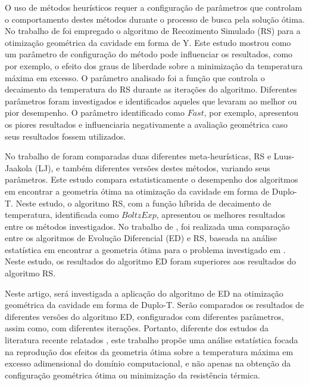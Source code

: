 \documentclass[12pt,A4,A4pt]{article}
\begin{document}
O uso de métodos heurísticos requer a configuração de parâmetros que controlam o comportamento destes métodos durante o processo de busca pela solução ótima. No trabalho de \cite{Gonzales2015energy} foi empregado o algoritmo de Recozimento Simulado (RS) para a otimização geométrica da cavidade em forma de Y. Este estudo mostrou como um parâmetro de configuração do método pode influenciar os resultados, como por exemplo, o efeito dos graus de liberdade sobre a minimização da temperatura máxima em excesso. O parâmetro analisado foi a função que controla o decaimento da temperatura do RS durante as iterações do algoritmo. Diferentes parâmetros foram investigados e identificados aqueles que levaram ao melhor ou pior desempenho. O parâmetro identificado como $Fast$, por exemplo, apresentou os piores resultados e influenciaria negativamente a avaliação geométrica caso seus resultados fossem utilizados. 

No trabalho de \cite{Gonzales2017} foram comparadas duas diferentes meta-heurísticas, RS e Luus-Jaakola (LJ), e também diferentes versões destes métodos, variando seus parâmetros. Este estudo compara estatisticamente o desempenho dos algoritmos em encontrar a geometria ótima na otimização da cavidade em forma de Duplo-T. Neste estudo, o algoritmo RS, com a função híbrida de decaimento de temperatura, identificada como $BoltzExp$, apresentou os melhores resultados entre os métodos investigados. No trabalho de \cite{Gonzales2018}, foi realizada uma comparação entre os algoritmos de Evolução Diferencial (ED) e RS, baseada na análise estatística em encontrar a geometria ótima para o problema investigado em \cite{Gonzales2017}. Neste estudo, os resultados do algoritmo ED foram superiores aos resultados do algoritmo RS.

Neste artigo, será investigada a aplicação do algoritmo de ED na otimização geométrica da cavidade em forma de Duplo-T. Serão comparados os resultados de diferentes versões do algoritmo ED, configurados com diferentes parâmetros, assim como, com diferentes iterações. Portanto, diferente dos estudos da literatura recente relatados \citep{Gonzales2017, Gonzales2018}, este trabalho propõe uma análise estatística focada na reprodução dos efeitos da geometria ótima sobre a temperatura máxima em excesso adimensional do domínio computacional, e não apenas na obtenção da configuração geométrica ótima ou minimização da resistência térmica.
\end{document}
